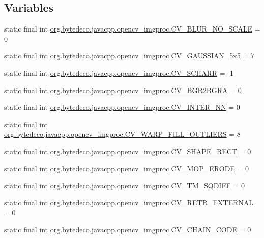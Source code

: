 \subsection*{Variables}
\begin{DoxyCompactItemize}
\item 
static final int \hyperlink{group__imgproc__c_ga41b42253aaff66342934c5f37e1d2024}{org.\+bytedeco.\+javacpp.\+opencv\+\_\+imgproc.\+C\+V\+\_\+\+B\+L\+U\+R\+\_\+\+N\+O\+\_\+\+S\+C\+A\+LE} = 0
\item 
static final int \hyperlink{group__imgproc__c_ga528289c1a7349496d926a9a2ddae3b51}{org.\+bytedeco.\+javacpp.\+opencv\+\_\+imgproc.\+C\+V\+\_\+\+G\+A\+U\+S\+S\+I\+A\+N\+\_\+5x5} = 7
\item 
static final int \hyperlink{group__imgproc__c_gad680d8093fc7352b21881b08002d7698}{org.\+bytedeco.\+javacpp.\+opencv\+\_\+imgproc.\+C\+V\+\_\+\+S\+C\+H\+A\+RR} = -\/1
\item 
static final int \hyperlink{group__imgproc__c_ga2a997fb46eb3c46bcb8c1a1af53baf03}{org.\+bytedeco.\+javacpp.\+opencv\+\_\+imgproc.\+C\+V\+\_\+\+B\+G\+R2\+B\+G\+RA} = 0
\item 
static final int \hyperlink{group__imgproc__c_gabe5d6b644796472a88a9bc67bc7ec400}{org.\+bytedeco.\+javacpp.\+opencv\+\_\+imgproc.\+C\+V\+\_\+\+I\+N\+T\+E\+R\+\_\+\+NN} = 0
\item 
static final int \hyperlink{group__imgproc__c_gab5f8b66bd10e5b45a6565b34cf8e490b}{org.\+bytedeco.\+javacpp.\+opencv\+\_\+imgproc.\+C\+V\+\_\+\+W\+A\+R\+P\+\_\+\+F\+I\+L\+L\+\_\+\+O\+U\+T\+L\+I\+E\+RS} = 8
\item 
static final int \hyperlink{group__imgproc__c_gae9f68d923c5dff530693edea39e513af}{org.\+bytedeco.\+javacpp.\+opencv\+\_\+imgproc.\+C\+V\+\_\+\+S\+H\+A\+P\+E\+\_\+\+R\+E\+CT} = 0
\item 
static final int \hyperlink{group__imgproc__c_gafa232583b0fa5354f919dc91623c4be9}{org.\+bytedeco.\+javacpp.\+opencv\+\_\+imgproc.\+C\+V\+\_\+\+M\+O\+P\+\_\+\+E\+R\+O\+DE} = 0
\item 
static final int \hyperlink{group__imgproc__c_gacdf613bdd0296dad8c1c1e94fb42c93e}{org.\+bytedeco.\+javacpp.\+opencv\+\_\+imgproc.\+C\+V\+\_\+\+T\+M\+\_\+\+S\+Q\+D\+I\+FF} = 0
\item 
static final int \hyperlink{group__imgproc__c_gae346e956c48bb671a642f55d8731797f}{org.\+bytedeco.\+javacpp.\+opencv\+\_\+imgproc.\+C\+V\+\_\+\+R\+E\+T\+R\+\_\+\+E\+X\+T\+E\+R\+N\+AL} = 0
\item 
static final int \hyperlink{group__imgproc__c_ga805d058895793b75bdcfdfcf74cc6831}{org.\+bytedeco.\+javacpp.\+opencv\+\_\+imgproc.\+C\+V\+\_\+\+C\+H\+A\+I\+N\+\_\+\+C\+O\+DE} = 0

\end{DoxyCompactItemize}
